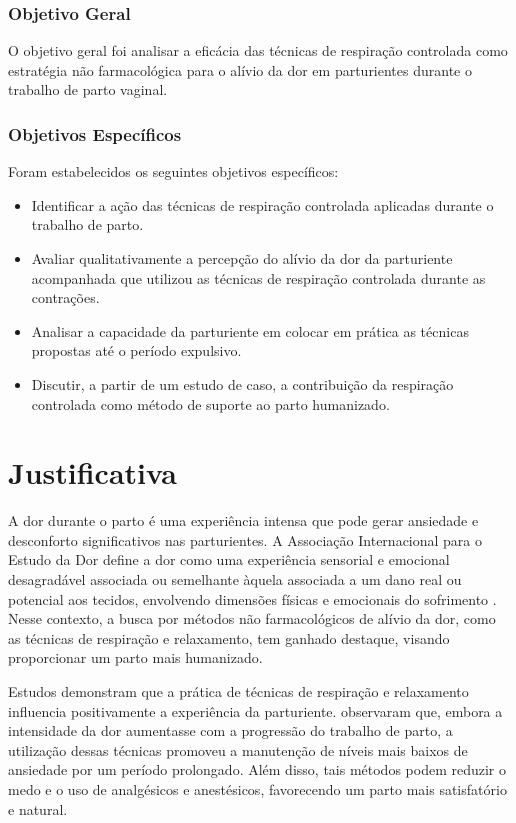 \documentclass[openright]{tex/estilos/normas-utf-tex}
\begin{document}
\subsection{Objetivo Geral}
\label{subsec:objetivo-geral}

O objetivo geral foi analisar a eficácia das técnicas de respiração controlada como estratégia não farmacológica para o alívio da dor em parturientes durante o trabalho de parto vaginal.

\subsection{Objetivos Específicos}
\label{subsec:objetivos-especificos}

Foram estabelecidos os seguintes objetivos específicos:

\begin{itemize}
    \item Identificar a ação das técnicas de respiração controlada aplicadas durante o trabalho de parto.
    \item Avaliar qualitativamente a percepção do alívio da dor da parturiente acompanhada que utilizou as técnicas de respiração controlada durante as contrações.
    \item Analisar a capacidade da parturiente em colocar em prática as técnicas propostas até o período expulsivo.
    \item Discutir, a partir de um estudo de caso, a contribuição da respiração controlada como método de suporte ao parto humanizado.
\end{itemize}

\chapter{Justificativa}
\label{chap:justificativa}

A dor durante o parto é uma experiência intensa que pode gerar ansiedade e desconforto significativos nas parturientes. A Associação Internacional para o Estudo da Dor define a dor como uma experiência sensorial e emocional desagradável associada ou semelhante àquela associada a um dano real ou potencial aos tecidos, envolvendo dimensões físicas e emocionais do sofrimento \cite{raja2020}. Nesse contexto, a busca por métodos não farmacológicos de alívio da dor, como as técnicas de respiração e relaxamento, tem ganhado destaque, visando proporcionar um parto mais humanizado.

Estudos demonstram que a prática de técnicas de respiração e relaxamento influencia positivamente a experiência da parturiente.  observaram que, embora a intensidade da dor aumentasse com a progressão do trabalho de parto, a utilização dessas técnicas promoveu a manutenção de níveis mais baixos de ansiedade por um período prolongado. Além disso, tais métodos podem reduzir o medo e o uso de analgésicos e anestésicos, favorecendo um parto mais satisfatório e natural.
\end{document}
